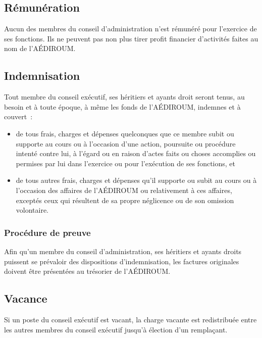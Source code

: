 \documentclass{aediroum}
\begin{document}
\subsection{Rémunération}\label{sec:renumeration}

Aucun des membres du conseil d'administration n'est rémunéré pour l'exercice de ses fonctions. Ils ne peuvent pas non plus tirer profit financier d'activités faites au nom de l'AÉDIROUM.

\subsection{Indemnisation}\label{sec:indemnisation}

Tout membre du conseil exécutif, ses héritiers et ayants droit seront tenus, au besoin et à toute époque, à même les fonds de l'AÉDIROUM, indemnes et à couvert~:
\begin{itemize}
\item de tous frais, charges et dépenses quelconques que ce membre subit ou supporte au cours ou à l'occasion d'une action, poursuite ou procédure intenté contre lui, à l'égard ou en raison d'actes faits ou choses accomplies ou permises par lui dans l'exercice ou pour l'exécution de ses fonctions, et
\item de tous autres frais, charges et dépenses qu'il supporte ou subit au cours ou à l'occasion des affaires de l'AÉDIROUM ou relativement à ces affaires, exceptés ceux qui résultent de sa propre néglicence ou de son omission volontaire.
\end{itemize}

\subsubsection{Procédure de preuve}\label{sec:procedure-de-preuve}

Afin qu'un membre du conseil d'administration, ses héritiers et ayants droits puissent se prévaloir des dispositions d'indemnisation, les factures originales doivent être présentées au trésorier de l'AÉDIROUM.

\subsection{Vacance}\label{sec:vacance}

Si un poste du conseil exécutif est vacant, la charge vacante est redistribuée entre les autres membres du conseil exécutif jusqu'à élection d'un remplaçant.
\end{document}
